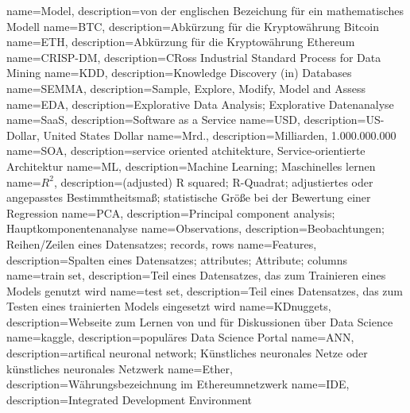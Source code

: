 {
    name=Model,
    description={von der englischen Bezeichung für ein mathematisches Modell}
}
{
    name=BTC,
    description={Abkürzung für die Kryptowährung Bitcoin}
}
{
    name=ETH,
    description={Abkürzung für die Kryptowährung Ethereum}
}
{
    name=CRISP-DM,
    description={CRoss Industrial Standard Process for Data Mining}
}
{
    name=KDD,
    description={Knowledge Discovery (in) Databases }
}
{
    name=SEMMA,
    description={Sample, Explore, Modify, Model and Assess}
}
{
    name=EDA,
    description={Explorative Data Analysis; Explorative Datenanalyse}
}
{
    name=SaaS,
    description={Software as a Service}
}
{
    name=USD,
    description={US-Dollar, United States Dollar}
}
{
    name=Mrd.,
    description={Milliarden, 1.000.000.000}
}
{
    name=SOA,
    description={service oriented atchitekture, Service-orientierte Architektur}
}
{
    name=ML,
    description={Machine Learning; Maschinelles lernen}
}
{
    name=$ R^2 $,
    description={(adjusted) R squared; R-Quadrat; adjustiertes oder angepasstes Bestimmtheitsmaß; statistische Größe bei der Bewertung einer Regression}
}
{
    name=PCA,
    description={Principal component analysis; Hauptkomponentenanalyse}
}
{
    name=Observations,
    description={Beobachtungen; Reihen/Zeilen eines Datensatzes; records, rows}
}
{
    name=Features,
    description={Spalten eines Datensatzes; attributes; Attribute; columns}
}
{
    name=train set,
    description={Teil eines Datensatzes, das zum Trainieren eines Models genutzt wird}
}
{
    name=test set,
    description={Teil eines Datensatzes, das zum Testen eines trainierten Models eingesetzt wird}
}
{
    name=KDnuggets,
    description={Webseite zum Lernen von und für Diskussionen über Data Science}
}
{
    name=kaggle,
    description={populäres Data Science Portal}
}
{
    name=ANN,
    description={artifical neuronal network; Künstliches neuronales Netze oder künstliches neuronales Netzwerk}
}
{
    name=Ether,
    description={Währungsbezeichnung im Ethereumnetzwerk}
}
{
    name=IDE,
    description={Integrated Development Environment}
}
